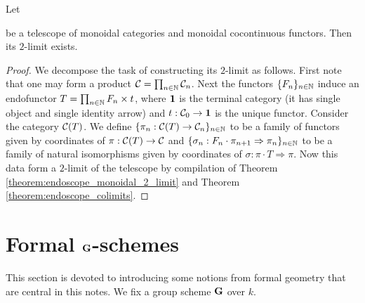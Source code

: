 \begin{corollary}\label{corollary:telescope_2_limits}
Let 
\begin{center}   
\end{center}
be a telescope of monoidal categories and monoidal cocontinuous functors. Then its $2$-limit exists.
\end{corollary}
\begin{proof}
We decompose the task of constructing its $2$-limit as follows. First note that one may form a product ${\mathcal C} = \prod_{n\in {\mathbb N}}{\mathcal C}_n$. Next the functors $\{F_n\}_{n\in {\mathbb N}}$ induce an endofunctor $T = \prod_{n\in {\mathbb N}}F_n\times t$, where $\mathbf{1}$ is the terminal category (it has single object and single identity arrow) and $t:{\mathcal C}_0\rightarrow \mathbf{1}$ is the unique functor. Consider the category ${\mathcal C}(T)$. We define $\{\pi_n:{\mathcal C}(T)\rightarrow {\mathcal C}_n\}_{n\in {\mathbb N}}$ to be a family of functors given by coordinates of $\pi:{\mathcal C}(T)\rightarrow {\mathcal C}$ and $\{\sigma_n:F_n\cdot \pi_{n+1}\Rightarrow \pi_n\}_{n\in {\mathbb N}}$ to be a family of natural isomorphisms given by coordinates of $\sigma:\pi\cdot T\Rightarrow \pi$. Now this data form a $2$-limit of the telescope by compilation of Theorem \ref{theorem:endoscope_monoidal_2_limit} and Theorem \ref{theorem:endoscope_colimits}.
\end{proof}

\section{Formal $\mathbf{G}$-schemes}
\noindent
This section is devoted to introducing some notions from formal geometry that are central in this notes. We fix a group scheme $\mathbf{G}$ over $k$. 

